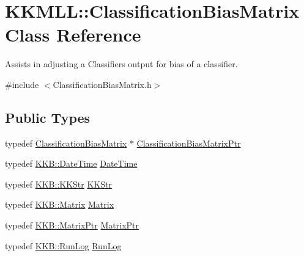 \hypertarget{class_k_k_m_l_l_1_1_classification_bias_matrix}{}\section{K\+K\+M\+LL\+:\+:Classification\+Bias\+Matrix Class Reference}
\label{class_k_k_m_l_l_1_1_classification_bias_matrix}


Assists in adjusting a Classifiers output for bias of a classifier.  




{\ttfamily \#include $<$Classification\+Bias\+Matrix.\+h$>$}

\subsection*{Public Types}
\begin{DoxyCompactItemize}
\item 
typedef \hyperlink{class_k_k_m_l_l_1_1_classification_bias_matrix}{Classification\+Bias\+Matrix} $\ast$ \hyperlink{class_k_k_m_l_l_1_1_classification_bias_matrix_a62b9ebf8fa4f7669dec9248876945bff}{Classification\+Bias\+Matrix\+Ptr}
\item 
typedef \hyperlink{class_k_k_b_1_1_date_time}{K\+K\+B\+::\+Date\+Time} \hyperlink{class_k_k_m_l_l_1_1_classification_bias_matrix_a572e2991c935f630d576a87a5302f640}{Date\+Time}
\item 
typedef \hyperlink{class_k_k_b_1_1_k_k_str}{K\+K\+B\+::\+K\+K\+Str} \hyperlink{class_k_k_m_l_l_1_1_classification_bias_matrix_a80f330b2f5e53d06e2a347b5e16f9f86}{K\+K\+Str}
\item 
typedef \hyperlink{class_k_k_b_1_1_matrix}{K\+K\+B\+::\+Matrix} \hyperlink{class_k_k_m_l_l_1_1_classification_bias_matrix_aa42a3655845e9f5e464b49b044cdb11c}{Matrix}
\item 
typedef \hyperlink{namespace_k_k_b_a6e7c1ba6b19bffb29c885d2a62e7d235}{K\+K\+B\+::\+Matrix\+Ptr} \hyperlink{class_k_k_m_l_l_1_1_classification_bias_matrix_ae298f32248d959dfa0d806e13f2ddd71}{Matrix\+Ptr}
\item 
typedef \hyperlink{class_k_k_b_1_1_run_log}{K\+K\+B\+::\+Run\+Log} \hyperlink{class_k_k_m_l_l_1_1_classification_bias_matrix_ab6fc6dde0c82d6a5420851c07efb6184}{Run\+Log}
\end{DoxyCompactItemize}
